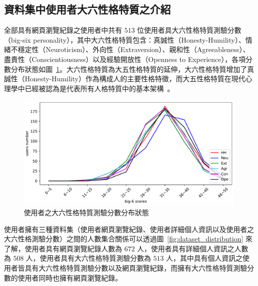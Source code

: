 \subsection{資料集中使用者大六性格特質之介紹}
{
全部具有網頁瀏覽紀錄之使用者中共有 $513$ 位使用者具大六性格特質測驗分數（big-six personality），其中大六性格特質包含：真誠性（Honesty-Humility）、情緒不穩定性（Neuroticism）、外向性（Extraversion）、親和性（Agreeableness）、盡責性（Conscientiousness）以及經驗開放性（Openness to Experience），各項分數分布狀態如圖~\ref{fig:pr_distribution}。大六性格特質為大五性格特質的延伸，大六性格特質增加了真誠性（Honesty-Humility）作為構成人的主要性格特徵，而大五性格特質在現代心理學中已經被認為是代表所有人格特質中的基本架構~\cite{o2002quantitative}。 \par

\begin{figure}[h]
    \graphicspath{{fig/}}
    \begin{center}
    \includegraphics[scale=0.6]{fig/pr_dist.pdf}
    \caption{使用者之大六性格特質測驗分數分布狀態}
    \label{fig:pr_distribution}
    \end{center}
\end{figure}


使用者擁有三種資料集（使用者網頁瀏覽紀錄、使用者詳細個人資訊以及使用者之大六性格測驗分數）之間的人數集合關係可以透過圖~\ref{fig:dataset_distribution} 來了解，使用者具有網頁瀏覽紀錄人數為 $672$ 人，使用者具有詳細個人資訊之人數為 $508$ 人，使用者具有大六性格特質測驗分數為 $513$ 人，其中具有個人資訊之使用者皆具有大六性格特質測驗分數以及網頁瀏覽紀錄，而擁有大六性格特質測驗分數的使用者同時也擁有網頁瀏覽紀錄。

}
